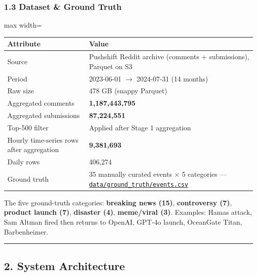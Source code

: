\documentclass[
]{article}
\begin{document}
\subsubsection{1.3 Dataset \& Ground
Truth}\label{13-dataset--ground-truth}

\begin{table}[H]
\centering
\begin{adjustbox}{max width=\textwidth}
\begin{tabular}{@{}ll@{}}
\toprule
Attribute & Value \\
\midrule
Source                                   & Pushshift Reddit archive (comments + submissions), Parquet on S3 \\
Period                                   & 2023-06-01 $\rightarrow$ 2024-07-31 (14 months) \\
Raw size                                 & 478 GB (snappy Parquet) \\
Aggregated comments                      & \textbf{1,187,443,795} \\
Aggregated submissions                   & \textbf{87,224,551} \\
Top-500 filter                           & Applied after Stage 1 aggregation \\
Hourly time-series rows after aggregation & \textbf{9,381,693} \\
Daily rows                               & 406,274 \\
Ground truth                             & 35 manually curated events $\times$ 5 categories ---
                                           \href{data/ground_truth/events.csv}{\texttt{data/ground\_truth/events.csv}} \\
\bottomrule
\end{tabular}
\end{adjustbox}
\end{table}

The five ground-truth categories: \textbf{breaking news (15)},
\textbf{controversy (7)}, \textbf{product launch (7)}, \textbf{disaster
(4)}, \textbf{meme/viral (3)}. Examples: Hamas attack, Sam Altman fired
then returns to OpenAI, GPT-4o launch, OceanGate Titan, Barbenheimer.

\begin{center}\rule{0.5\linewidth}{0.5pt}\end{center}

\subsection{2. System Architecture}\label{2-system-architecture}
\end{document}
